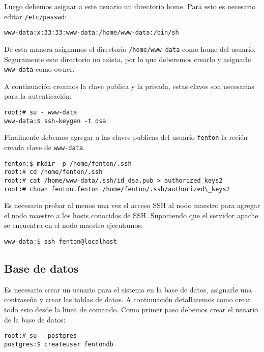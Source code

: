 \documentclass[a4paper,10pt,spanish]{article}
\begin{document}
Luego debemos asignar a este usuario un directorio home. Para esto es necesario editar \mbox{\texttt{/etc/passwd}}:

\begin{verbatim}
www-data:x:33:33:www-data:/home/www-data:/bin/sh
\end{verbatim}

De esta manera asignamos el directorio \mbox{\texttt{/home/www-data}} como home del usuario. Seguramente este directorio no exista, por lo que deberemos crearlo y asignarle \mbox{\texttt{www-data}} como owner.

A continuaci\'{o}n creamos la clave publica y la privada, estas claves son necesarias para la autenticaci\'{o}n:

\begin{verbatim}
root:# su - www-data
www-data:$ ssh-keygen -t dsa
\end{verbatim}

Finalmente debemos agregar a las claves publicas del usuario \mbox{\texttt{fenton}} la reci\'{e}n creada clave de \mbox{\texttt{www-data}}.

\begin{verbatim}
fenton:$ mkdir -p /home/fenton/.ssh
root:# cd /home/fenton/.ssh
root:# cat /home/www-data/.ssh/id_dsa.pub > authorized_keys2
root:# chown fenton.fenton /home/fenton/.ssh/authorized\_keys2
\end{verbatim}

Es necesario probar al menos una vez el acceso SSH al nodo maestro para agregar el nodo maestro a los hosts conocidos de SSH. Suponiendo que el servidor apache se encuentra en el nodo maestro ejecutamos:

\begin{verbatim}
www-data:$ ssh fenton@localhost
\end{verbatim}

\subsection{Base de datos}

Es necesario crear un usuario para el sistema en la base de datos, asignarle una contrase\~{n}a y crear las tablas de datos. A continuaci\'{o}n detallaremos como crear todo esto desde la linea de comando. Como primer paso debemos crear el usuario de la base de datos:

\begin{verbatim}
root:# su - postgres 
postgres:$ createuser fentondb 
\end{verbatim}
\end{document}
